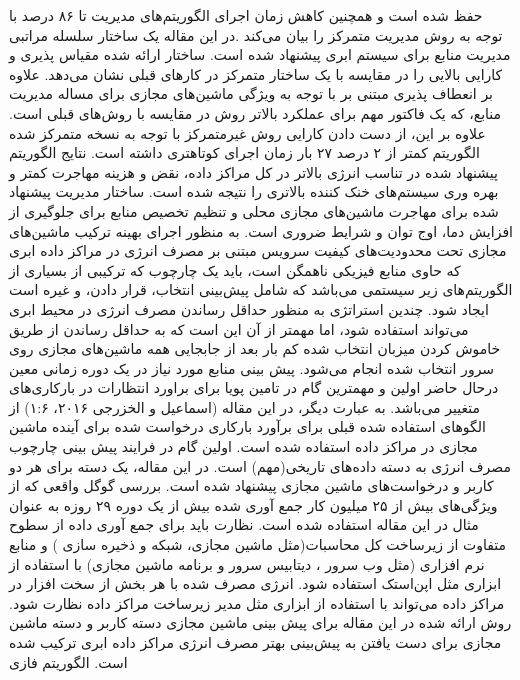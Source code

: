      حفظ شده است و همچنین کاهش زمان اجرای الگوریتم‌های مدیریت تا  ۸۶ درصد با توجه به روش مدیریت متمرکز را بیان می‌کند .در این مقاله یک ساختار سلسله مراتبی مدیریت منابع برای سیستم ابری پیشنهاد شده است. ساختار ارائه شده مقیاس پذیری و کارایی بالایی را در مقایسه با یک ساختار متمرکز در کارهای قبلی نشان می‌دهد. علاوه بر انعطاف پذیری مبتنی بر
      با توجه به ویژگی ماشین‌های مجازی برای مساله مدیریت منابع، که  یک فاکتور مهم برای عملکرد بالاتر روش در مقایسه با روش‌های قبلی است. علاوه بر این، از دست دادن کارایی روش غیرمتمرکز با توجه به نسخه متمرکز شده الگوریتم کمتر از ۲ درصد ۲۷ بار زمان اجرای کوتاهتری داشته است. نتایج الگوریتم پیشنهاد شده در تناسب انرژی بالاتر در کل مراکز داده، نقض
      و هزینه مهاجرت کمتر و بهره وری سیستم‌های خنک کننده بالاتری را نتیجه شده است. ساختار مدیریت پیشنهاد شده برای مهاجرت ماشین‌های مجازی محلی و تنظیم تخصیص منابع برای جلوگیری از افزایش دما، اوج توان و شرایط
      ضروری است.
به منظور اجرای بهینه ترکیب ماشین‌های مجازی تحت محدودیت‌های کیفیت سرویس
مبتنی بر مصرف انرژی در مراکز داده ابری که حاوی منابع فیزیکی ناهمگن است، باید یک چارچوب که ترکیبی از بسیاری از الگوریتم‌های زیر سیستمی‌ می‌باشد که شامل  پیش‌بینی انتخاب، قرار دادن، و غیره است ایجاد شود. چندین استراتژی به منظور حداقل رساندن مصرف انرژی در محیط ابری می‌تواند استفاده شود، اما مهمتر از آن این است که به حداقل رساندن از طریق خاموش کردن میزبان انتخاب شده کم بار بعد از جابجایی همه ماشین‌های مجازی روی سرور انتخاب شده انجام می‌شود. پیش بینی منابع مورد نیاز در یک دوره زمانی معین درحال حاضر اولین و مهمترین گام در تامین پویا برای براورد انتظارات
 در بارکاری‌های متغییر می‌باشد. به عبارت دیگر، در این مقاله 
 (اسماعیل و الخزرجی ۲۰۱۶، ۱:۶)
 از الگوهای استفاده شده قبلی برای برآورد بارکاری درخواست شده برای آینده ماشین مجازی در مراکز داده  استفاده شده است. اولین گام در فرایند پیش بینی چارچوب مصرف انرژی به دسته داده‌های تاریخی(مهم) است. در این مقاله، یک دسته برای هر دو کاربر و درخواست‌های ماشین مجازی پیشنهاد شده است. بررسی گوگل واقعی که از ویژگی‌های بیش از ۲۵ میلیون کار جمع آوری شده بیش از یک دوره ۲۹ روزه به عنوان مثال در این مقاله استفاده شده است. نظارت باید برای جمع آوری داده از سطوح متفاوت از زیرساخت کل محاسبات(مثل ماشین مجازی، شبکه و ذخیره سازی ) و منابع نرم افزاری (مثل وب سرور ، دیتابیس سرور و برنامه ماشین مجازی) با استفاده از ابزاری مثل‌ اپن‌استک استفاده شود. انرژی مصرف شده با هر بخش از سخت افزار در مراکز داده می‌تواند با استفاده از ابزاری مثل مدیر زیرساخت مراکز داده 
  نظارت شود. روش ارائه شده در این مقاله برای پیش بینی ماشین مجازی دسته کاربر و دسته ماشین مجازی برای دست یافتن به پیش‌بینی بهتر مصرف انرژی مراکز داده ابری ترکیب شده است. الگوریتم فازی
